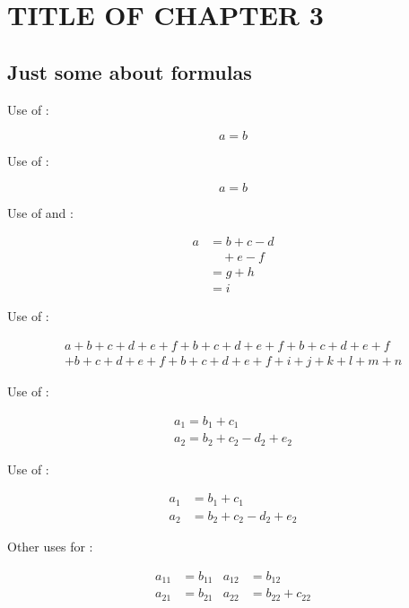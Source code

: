 ﻿%
\chapter{TITLE OF CHAPTER 3} %

\section{Just some about formulas}

Use of :

\begin{equation*}
a=b
\end{equation*}

Use of :

\begin{equation}
a=b
\end{equation}

Use of  and :

\begin{equation}\label{xx}
\begin{split}
a& =b+c-d\\
& \quad +e-f\\
& =g+h\\
& =i
\end{split}
\end{equation}

Use of :

\begin{multline}
a+b+c+d+e+f+b+c+d+e+f+b+c+d+e+f\\
+b+c+d+e+f+b+c+d+e+f+i+j+k+l+m+n
\end{multline}

Use of :

\begin{gather}
a_1=b_1+c_1\\
a_2=b_2+c_2-d_2+e_2 \label{eq:D}
\end{gather}

Use of :

\begin{align}
a_1& =b_1+c_1\\
a_2& =b_2+c_2-d_2+e_2
\end{align}

Other uses for :

\begin{align}
a_{11}& =b_{11}&
a_{12}& =b_{12}\\
a_{21}& =b_{21}&
a_{22}& =b_{22}+c_{22}
\end{align}

